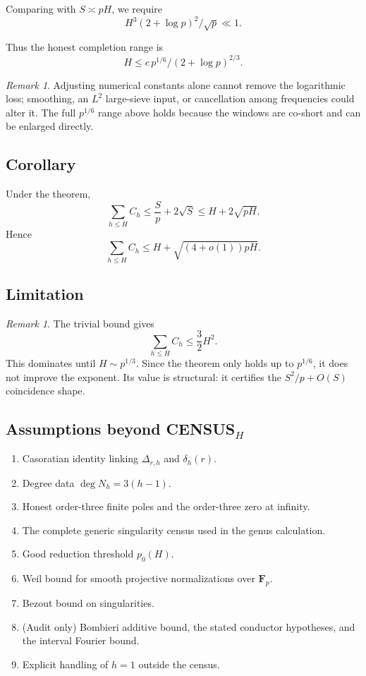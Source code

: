 \documentclass[11pt]{article}
\theoremstyle{remark}
\newtheorem{remark}[theorem]{Remark}
\newcommand{\Fp}{\mathbf F_p}
\begin{document}
Comparing with $S \asymp pH$, we require
\[
H^3 (2+\log p)^2 / \sqrt p \ll 1.
\]

Thus the honest completion range is
\[
\boxed{
H \le c \, p^{1/6} / (2+\log p)^{2/3}.
}
\]

\begin{remark}
Adjusting numerical constants alone cannot remove the logarithmic loss;
smoothing, an $L^2$ large-sieve input, or cancellation among frequencies
could alter it.  The full $p^{1/6}$ range above holds because the windows
are co-short and can be enlarged directly.
\end{remark}

\subsection*{Corollary}

\begin{corollary}
Under the theorem,
\[
\sum_{h \le H} C_h
\le \frac{S}{p} + 2\sqrt{S}
\le H + 2 \sqrt{pH}.
\]
Hence
\[
\sum_{h \le H} C_h
\le H + \sqrt{(4+o(1)) pH}.
\]
\end{corollary}

\subsection*{Limitation}

\begin{remark}
The trivial bound gives
\[
\sum_{h\le H} C_h \le \frac{3}{2} H^2.
\]
This dominates until $H \sim p^{1/3}$.
Since the theorem only holds up to $p^{1/6}$,
it does not improve the exponent.
Its value is structural: it certifies the
$S^2/p + O(S)$ coincidence shape.
\end{remark}

\subsection*{Assumptions beyond CENSUS$_H$}

\begin{enumerate}
\item Casoratian identity linking $\Delta_{r,h}$ and $\delta_h(r)$.
\item Degree data $\deg N_h = 3(h-1)$.
\item Honest order-three finite poles and the order-three zero at infinity.
\item The complete generic singularity census used in the genus calculation.
\item Good reduction threshold $p_0(H)$.
\item Weil bound for smooth projective normalizations over $\Fp$.
\item Bezout bound on singularities.
\item (Audit only) Bombieri additive bound, the stated conductor hypotheses,
and the interval Fourier bound.
\item Explicit handling of $h=1$ outside the census.
\end{enumerate}
\end{document}
